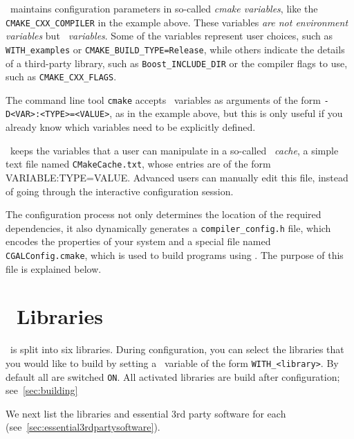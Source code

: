 \cmake\ maintains configuration parameters in so-called {\em cmake variables}, like the \texttt{CMAKE\_CXX\_COMPILER}
in the example above. These variables {\em are not environment variables} but {\em \cmake\ variables}. Some of the \cmake{} 
variables represent user choices, such as \texttt{WITH\_examples} or \texttt{CMAKE\_BUILD\_TYPE=Release}, while others
indicate the details of a third-party library, such as \texttt{Boost\_INCLUDE\_DIR} or the compiler flags to use,
such as \texttt{CMAKE\_CXX\_FLAGS}. 

The command line tool \texttt{cmake} accepts \cmake\ variables as arguments of the form \texttt{-D<VAR>:<TYPE>=<VALUE>}, as
in the example above, but this is only useful if you already know which variables need to be explicitly defined.

\begin{ccAdvanced}
\cmake\ keeps the variables that a user can manipulate in a so-called {\em \cmake\ cache}, a simple text file 
named \texttt{CMakeCache.txt}, whose entries are of the form VARIABLE:TYPE=VALUE. Advanced users can manually edit this 
file, instead of going through the interactive configuration session.
\end{ccAdvanced}


The configuration process not only determines the location of the required dependencies, it also dynamically generates a
\texttt{compiler\_config.h} file, which encodes the properties of your system and a special file named 
\texttt{CGALConfig.cmake}, which is used to build programs using \cgal. The
purpose of this file is explained below.

\section{\cgal\ Libraries\label{sec:libraries}}

\cgal\ is split into six libraries. During configuration, you can select the libraries that 
you would like to build by setting a \cmake\ variable of the form {\tt WITH\_<library>}. By default all 
are switched \texttt{ON}. All activated libraries are build after
configuration; see~\ref{sec:building}

We next list the libraries and essential 3rd party software for each (see~\ref{sec:essential3rdpartysoftware}).

